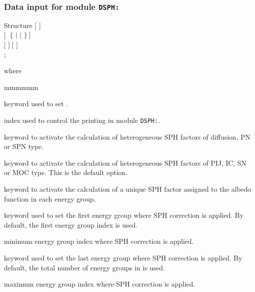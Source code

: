\subsubsection{Data input for module {\tt DSPH:}}\label{sect:dsph_data}

\begin{DataStructure}{Structure }
$[$   $]$ \\
$[~$ $\{$  $|$  $|$  $\}~]$ \\
$[$   $]~[$   $]$\\
;
\end{DataStructure}

\noindent where
\begin{ListeDeDescription}{mmmmmm}

\item[\moc{EDIT}] keyword used to set .

\item[\dusa{iprint}] index used to control the printing in module {\tt DSPH:}.

\item[\moc{PN}] keyword to activate the calculation of heterogeneous SPH factors of diffusion, PN or SPN type.

\item[\moc{SN}] keyword to activate the calculation of heterogeneous SPH factors of PIJ, IC, SN or MOC type.
This is the default option.

\item[\moc{ALBEDO}] keyword to activate the calculation of a unique SPH factor assigned to the albedo function
in each energy group.

\item[\moc{GRPMIN}] keyword used to set the first energy group where SPH correction is applied. By default,
the first energy group index is used.

\item[\dusa{ngr1}] minimum energy group index where SPH correction is applied.

\item[\moc{GRPMAX}] keyword used to set the last energy group where SPH correction is applied. By default,
the total number of energy groups in  is used.

\item[\dusa{ngr2}] maximum energy group index where SPH correction is applied.

\end{ListeDeDescription}
\clearpage
